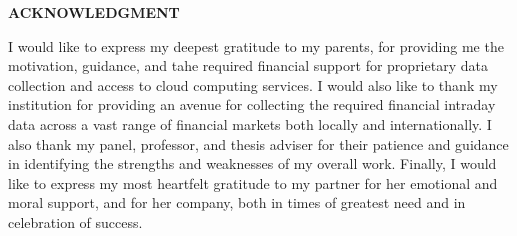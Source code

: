 \documentclass[stu,floatsintext]{apa7}
\begin{document}
\newpage
{}
{}
\begin{center}
{\bfseries ACKNOWLEDGMENT}
\end{center}
\vspace{0.3in}

I would like to express my deepest gratitude to my parents, for providing me the motivation, guidance, and tahe required financial support for proprietary data collection and access to cloud computing services. I would also like to thank my institution for providing an avenue for collecting the required financial intraday data across a vast range of financial markets both locally and internationally. I also thank my panel, professor, and thesis adviser for their patience and guidance in identifying the strengths and weaknesses of my overall work. Finally, I would like to express my most heartfelt gratitude to my partner for her emotional and moral support, and for her company, both in times of greatest need and in celebration of success.

\newpage
\tableofcontents
\thispagestyle{headings}

\newpage
{}
{}
\listoftables

\newpage
{}
{}
\listoffigures

%
%
\end{document}
